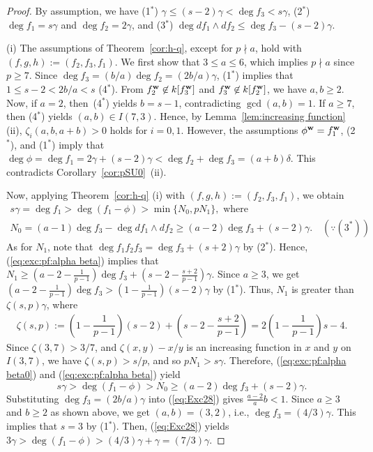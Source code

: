 \documentclass{amsart}
\theoremstyle{plain}
\theoremstyle{definition}
\newcommand{\w}{{\bf w}}
\begin{document}
\begin{proof}
By assumption, we have 
(1$^*$) $\gamma \le (s-2)\gamma <\deg f_3<s\gamma $, 
(2$^*$) $\deg f_1=s\gamma$ and $\deg f_2=2\gamma $, 
and (3$^*$) $\deg df_1\wedge df_2\le \deg f_3-(s-2)\gamma $. 


(i) 
The assumptions of Theorem~\ref{cor:h-q}, 
except for $p\nmid a$, 
hold with $(f,g,h):=(f_2,f_3,f_1)$. 
We first show that $3\le a\le 6$, 
which implies $p\nmid a$ since $p\ge 7$. 
Since $\deg f_3=(b/a)\deg f_2=(2b/a)\gamma $, 
(1$^*$) implies that $1\le s-2<2b/a<s$ (4$^*$). 
From $f_2^{\w }\not\in k[f_3^{\w }]$ and $f_3^{\w }\not\in k[f_2^{\w }]$, 
we have $a,b\ge 2$. 
Now, if $a=2$, 
then~(4$^*$) yields $b=s-1$, 
contradicting $\gcd (a,b)=1$. 
If $a\ge 7$, then (4$^*$) yields $(a,b)\in I(7,3)$. 
Hence, 
by Lemma~\ref{lem:increasing function} (ii), 
$\zeta _i(a,b,a+b)>0$ holds for $i=0,1$. 
However, 
the assumptions $\phi ^{\w }=f_1^{\w }$, 
(2$^*$), and (1$^*$) imply that $\deg \phi =\deg f_1
=2\gamma +(s-2)\gamma <\deg f_2+\deg f_3=(a+b)\delta $. 
This contradicts Corollary~\ref{cor:pSU0}~(ii). 




Now, 
applying Theorem~\ref{cor:h-q} (i) with $(f,g,h):=(f_2,f_3,f_1)$, 
we obtain 
\begin{gather}
s\gamma =\deg f_1>\deg (f_1-\phi )>\min \{ N_0,pN_1\} , 
\text{ where } \label{eq:exc:pf:alpha beta0} \\
N_0=(a-1)\deg f_3-\deg df_1\wedge df_2
\ge (a-2)\deg f_3+(s-2)\gamma \label{eq:exc:pf:alpha beta}. 
\quad (\because (3^*))
\end{gather}
As for $N_1$, 
note that $\deg f_1f_2f_3=\deg f_3+(s+2)\gamma $ by (2$^*$). 
Hence, 
(\ref{eq:exc:pf:alpha beta}) implies that 
$N_1\ge (a-2-\frac{1}{p-1})\deg f_3+(s-2-\frac{s+2}{p-1})\gamma $. 
Since 
$a\ge 3$, 
we get $(a-2-\frac{1}{p-1})\deg f_3>(1-\frac{1}{p-1})(s-2)\gamma $ 
by (1$^*$). 
Thus, 
$N_1$ is greater than $\zeta (s,p)\gamma $, 
where 
\begin{align*}
\zeta (s,p):=
\left( 1-\dfrac{1}{p-1}\right) (s-2)
+\left(s-2-\dfrac{s+2}{p-1}\right) 
=2\left( 1-\dfrac{1}{p-1}\right) s-4. 
\end{align*}
Since $\zeta (3,7)>3/7$, and 
$\zeta (x,y)-x/y$ is an increasing function in $x$ and $y$ on $I(3,7)$, 
we have $\zeta (s,p)>s/p$, 
and so 
$pN_1>s\gamma $. 
Therefore, 
(\ref{eq:exc:pf:alpha beta0}) and (\ref{eq:exc:pf:alpha beta}) 
yield 
\begin{equation}\label{eq:Exc28}
s\gamma >\deg (f_1-\phi )>N_0\ge (a-2)\deg f_3+(s-2)\gamma  .
\end{equation}
Substituting $\deg f_3=(2b/a)\gamma $ 
into (\ref{eq:Exc28}) gives $\frac{a-2}{a}b<1$. 
Since $a\ge 3$ and $b\ge 2$ as shown above, 
we get $(a,b)=(3,2)$, i.e., $\deg f_3=(4/3)\gamma $. 
This implies that $s=3$ by (1$^*$). 
Then, (\ref{eq:Exc28}) yields 
$3\gamma >\deg (f_1-\phi )>(4/3)\gamma +\gamma =(7/3)\gamma $. 





\end{proof}
\end{document}
